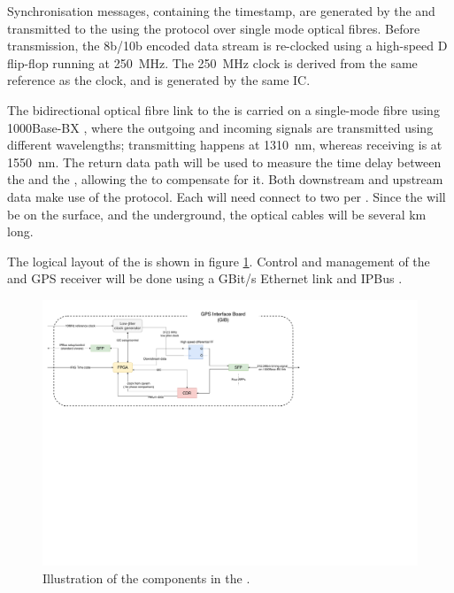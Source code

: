 \documentclass{dune}
\begin{document}
Synchronisation messages, containing the  timestamp, are generated by the  and transmitted to the  using the  protocol over single mode optical fibres. Before transmission, the 8b/10b encoded  data stream is re-clocked using a high-speed D flip-flop running at \SI{250}{\MHz}. The \SI{250}{\MHz} clock is derived from the same reference as the  clock, and is generated by the same IC.

The bidirectional optical fibre link to the  is carried on a single-mode fibre using 1000Base-BX , where the outgoing and incoming signals are transmitted using different wavelengths; transmitting happens at \SI{1310}{nm}, whereas receiving is at \SI{1550}{nm}. The return data path will be used to measure the time delay between the  and the , allowing the  to compensate for it. Both downstream and upstream data make use of the  protocol. Each  will need connect to two  per . Since the  will be on the surface, and the  underground, the optical cables will be several km long.

The logical layout of the  is shown in figure \ref{fig:gib_layout}. Control and management of the  and GPS receiver will be done using a GBit/s Ethernet link and IPBus \cite{ipbus}.

\begin{figure}[h]
\includegraphics[width=\textwidth]{gib_block_diagram.pdf}
\caption{Illustration of the components in the .}
\label{fig:gib_layout}
\end{figure}
\end{document}
